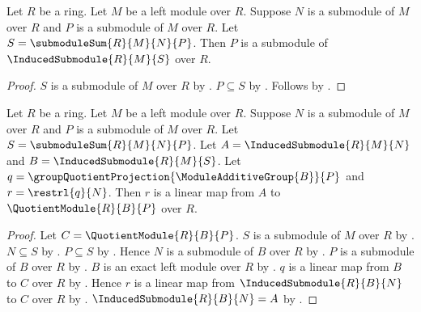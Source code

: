\begin{theorem}\label{module_second_isomorphism_summand_submodule}
    Let $R$ be a ring.
    Let $M$ be a left module over $R$.
    Suppose $N$ is a submodule of $M$ over $R$ and
        $P$ is a submodule of $M$ over $R$.
    Let $S=\submoduleSum{R}{M}{N}{P}$.
    Then $P$ is a submodule of $\InducedSubmodule{R}{M}{S}$ over $R$.
\end{theorem}
\begin{proof}
    $S$ is a submodule of $M$ over $R$ by
        .
    $P\subseteq S$ by .
    Follows by .
\end{proof}

\begin{theorem}\label{module_second_isomorphism_restriction_linear}
    Let $R$ be a ring.
    Let $M$ be a left module over $R$.
    Suppose $N$ is a submodule of $M$ over $R$ and
        $P$ is a submodule of $M$ over $R$.
    Let $S=\submoduleSum{R}{M}{N}{P}$.
    Let $A=\InducedSubmodule{R}{M}{N}$ and
        $B=\InducedSubmodule{R}{M}{S}$.
    Let $q=\groupQuotientProjection{\ModuleAdditiveGroup{B}}{P}$ and
        $r=\restrl{q}{N}$.
    Then $r$ is a linear map from $A$ to
        $\QuotientModule{R}{B}{P}$ over $R$.
\end{theorem}
\begin{proof}
    Let $C=\QuotientModule{R}{B}{P}$.
    $S$ is a submodule of $M$ over $R$ by
        .
    $N\subseteq S$ by .
    $P\subseteq S$ by .
    Hence $N$ is a submodule of $B$ over $R$ by
        .
    $P$ is a submodule of $B$ over $R$ by
        .
    $B$ is an exact left module over $R$ by
        .
    $q$ is a linear map from $B$ to $C$ over $R$ by
        .
    Hence $r$ is a linear map from
        $\InducedSubmodule{R}{B}{N}$ to $C$ over $R$ by
        .
    $\InducedSubmodule{R}{B}{N}=A$ by
        .
\end{proof}

